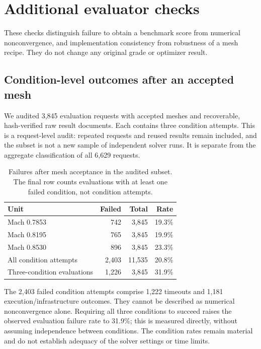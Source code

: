 \section{Additional evaluator checks}
\label{app:evaluator-checks}

These checks distinguish failure to obtain a benchmark score from numerical
nonconvergence, and implementation consistency from robustness of a mesh
recipe. They do not change any original grade or optimizer result.

\subsection{Condition-level outcomes after an accepted mesh}

We audited 3{,}845 evaluation requests with accepted meshes and recoverable,
hash-verified raw result documents. Each contains three condition attempts.
This is a request-level audit: repeated requests and reused results remain
included, and the subset is not a new sample of independent solver runs.
It is separate from the aggregate classification of all 6{,}629 requests.

\begin{table}[htbp]
\centering\small
\caption{Failures after mesh acceptance in the audited subset. The final row
counts evaluations with at least one failed condition, not condition attempts.}
\label{tab:flow-audit}
\begin{tabular}{lrrr}
\toprule
Unit & Failed & Total & Rate \\
\midrule
Mach 0.7853 & 742 & 3{,}845 & 19.3\% \\
Mach 0.8195 & 765 & 3{,}845 & 19.9\% \\
Mach 0.8530 & 896 & 3{,}845 & 23.3\% \\
All condition attempts & 2{,}403 & 11{,}535 & 20.8\% \\
Three-condition evaluations & 1{,}226 & 3{,}845 & 31.9\% \\
\bottomrule
\end{tabular}
\end{table}

The 2{,}403 failed condition attempts comprise 1{,}222 timeouts and 1{,}181
execution/infrastructure outcomes. They cannot be described as numerical
nonconvergence alone. Requiring all three conditions to succeed raises the
observed evaluation failure rate to 31.9\%; this is measured directly, without
assuming independence between conditions. The condition rates remain material
and do not establish adequacy of the solver settings or time limits.


